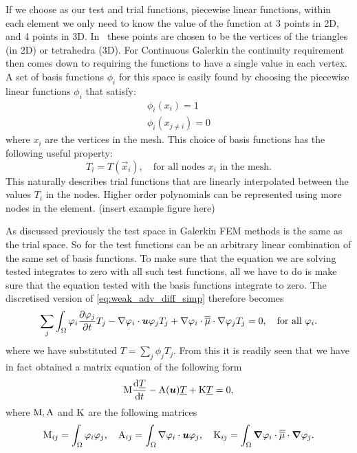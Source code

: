 If we choose \Pone as our test and trial functions, \ie piecewise linear
functions, within each element we only need to know the value 
of the function at 3 points in 2D, and 4 points in 3D. 
In \fluidity\ these points are chosen to be the vertices of 
the triangles (in 2D) or tetrahedra (3D). 
For Continuous Galerkin the continuity 
requirement then comes down to requiring 
the functions to have a single value in each
vertex. A set of basis functions $\phi_i$ 
for this space is easily found by choosing the piecewise linear functions
$\phi_i$ that satisfy:
\begin{gather*}
  \phi_i(x_i)=1\\
  \phi_i(x_{j\neq i})=0
\end{gather*}
where $x_i$ are the vertices in the mesh. 
This choice of basis functions has the following useful property:
\begin{equation*}
  T_i=T(\vec{x}_i),\quad \text{for all nodes $x_i$ in the mesh.}
\end{equation*}
This naturally describes trial functions that are linearly 
interpolated between the values $T_i$ in the nodes.
Higher order polynomials can be represented using more 
nodes in the element.
(insert \Ptwo example figure here)

As discussed previously the test space in Galerkin FEM methods is the same as the 
trial space. So for \PN the test functions can be an arbitrary linear combination 
of the same set of basis functions. To make sure that the equation we are solving 
tested integrates to zero with all such test functions, all we have to do is make sure
that the equation tested with the basis functions integrate to zero. The discretised 
version of \eqref{eq:weak_adv_diff_simp} therefore becomes
\begin{equation}
  \sum_j \int_\Omega \varphi_i \frac{\partial \varphi_j}{\partial t}  T_j -
    \nabla\varphi_i\cdot{\mbox{\boldmath$u$}}\varphi_j  T_j + 
    \nabla\varphi_i\cdot \overline{\overline{\mu}}\cdot\nabla \varphi_j T_j = 0,
    \quad\text{for all }\varphi_i.
\end{equation}
where we have substituted $T=\sum_j \phi_j T_j$. From this it is readily seen that 
we have in fact obtained a matrix equation of the following form
\begin{equation*}
  \mathrm{M} \frac{\mathrm{d}\underline{T}}{\mathrm{d} t}-\mathrm{A}({\mbox{\boldmath$u$}})\underline{T}+\mathrm{K}\underline{T}=0,
  \label{eq:cg_adv_diff_mat}
\end{equation*}
where $\mathrm{M}, \mathrm{A}$ and $\mathrm{K}$ are the following matrices
\begin{equation*}
  \mathrm{M}_{ij}=\int_\Omega \varphi_i\varphi_j, \quad
  \mathrm{A}_{ij}=\int_\Omega \nabla\varphi_i\cdot{\mbox{\boldmath$u$}} \varphi_j, \quad
  \mathrm{K}_{ij}=\int_\Omega {\mbox{\boldmath$\nabla$}}\varphi_i\cdot \overline{\overline{\mu}}\cdot{\mbox{\boldmath$\nabla$}} \varphi_j.
\end{equation*}

